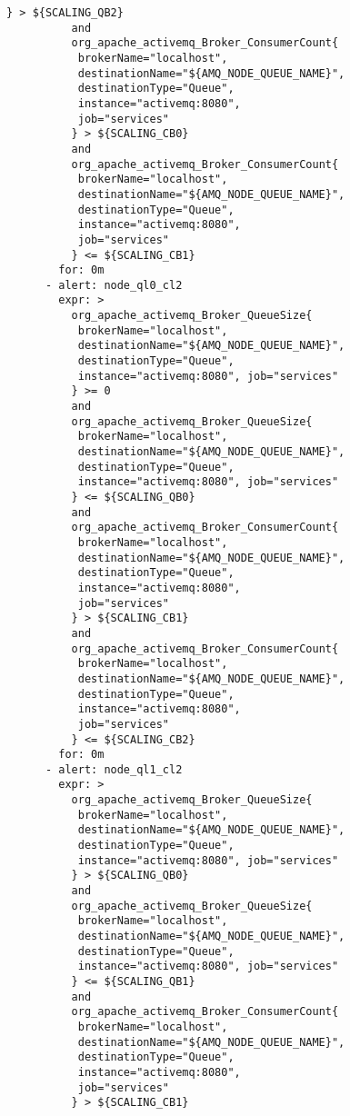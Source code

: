 \begin{lstlisting}[style=bashStyle,caption={alert-unparsed.yml},label=lst:alert-unparsed]
          } > ${SCALING_QB2}
          and 
          org_apache_activemq_Broker_ConsumerCount{
           brokerName="localhost",
           destinationName="${AMQ_NODE_QUEUE_NAME}", 
           destinationType="Queue",
           instance="activemq:8080", 
           job="services"
          } > ${SCALING_CB0}
          and
          org_apache_activemq_Broker_ConsumerCount{
           brokerName="localhost",
           destinationName="${AMQ_NODE_QUEUE_NAME}", 
           destinationType="Queue",
           instance="activemq:8080", 
           job="services"
          } <= ${SCALING_CB1}
        for: 0m
      - alert: node_ql0_cl2
        expr: >
          org_apache_activemq_Broker_QueueSize{
           brokerName="localhost", 
           destinationName="${AMQ_NODE_QUEUE_NAME}",
           destinationType="Queue", 
           instance="activemq:8080", job="services"
          } >= 0
          and 
          org_apache_activemq_Broker_QueueSize{
           brokerName="localhost", 
           destinationName="${AMQ_NODE_QUEUE_NAME}",
           destinationType="Queue", 
           instance="activemq:8080", job="services"
          } <= ${SCALING_QB0}
          and 
          org_apache_activemq_Broker_ConsumerCount{
           brokerName="localhost",
           destinationName="${AMQ_NODE_QUEUE_NAME}", 
           destinationType="Queue",
           instance="activemq:8080", 
           job="services"
          } > ${SCALING_CB1}
          and
          org_apache_activemq_Broker_ConsumerCount{
           brokerName="localhost",
           destinationName="${AMQ_NODE_QUEUE_NAME}", 
           destinationType="Queue",
           instance="activemq:8080", 
           job="services"
          } <= ${SCALING_CB2}
        for: 0m
      - alert: node_ql1_cl2
        expr: >
          org_apache_activemq_Broker_QueueSize{
           brokerName="localhost", 
           destinationName="${AMQ_NODE_QUEUE_NAME}",
           destinationType="Queue", 
           instance="activemq:8080", job="services"
          } > ${SCALING_QB0}
          and 
          org_apache_activemq_Broker_QueueSize{
           brokerName="localhost", 
           destinationName="${AMQ_NODE_QUEUE_NAME}",
           destinationType="Queue", 
           instance="activemq:8080", job="services"
          } <= ${SCALING_QB1}
          and 
          org_apache_activemq_Broker_ConsumerCount{
           brokerName="localhost",
           destinationName="${AMQ_NODE_QUEUE_NAME}", 
           destinationType="Queue",
           instance="activemq:8080", 
           job="services"
          } > ${SCALING_CB1}

\end{lstlisting}
